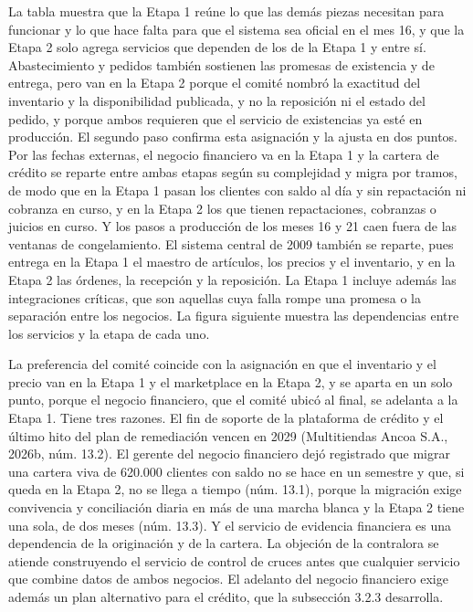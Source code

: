 \documentclass[11pt]{article}
\begin{document}
La tabla muestra que la Etapa 1 reúne lo que las demás piezas necesitan para funcionar y lo que hace falta para que el sistema sea oficial en el mes 16, y que la Etapa 2 solo agrega servicios que dependen de los de la Etapa 1 y entre sí. Abastecimiento y pedidos también sostienen las promesas de existencia y de entrega, pero van en la Etapa 2 porque el comité nombró la exactitud del inventario y la disponibilidad publicada, y no la reposición ni el estado del pedido, y porque ambos requieren que el servicio de existencias ya esté en producción. El segundo paso confirma esta asignación y la ajusta en dos puntos. Por las fechas externas, el negocio financiero va en la Etapa 1 y la cartera de crédito se reparte entre ambas etapas según su complejidad y migra por tramos, de modo que en la Etapa 1 pasan los clientes con saldo al día y sin repactación ni cobranza en curso, y en la Etapa 2 los que tienen repactaciones, cobranzas o juicios en curso. Y los pasos a producción de los meses 16 y 21 caen fuera de las ventanas de congelamiento. El sistema central de 2009 también se reparte, pues entrega en la Etapa 1 el maestro de artículos, los precios y el inventario, y en la Etapa 2 las órdenes, la recepción y la reposición. La Etapa 1 incluye además las integraciones críticas, que son aquellas cuya falla rompe una promesa o la separación entre los negocios. La figura siguiente muestra las dependencias entre los servicios y la etapa de cada uno.


La preferencia del comité coincide con la asignación en que el inventario y el precio van en la Etapa 1 y el marketplace en la Etapa 2, y se aparta en un solo punto, porque el negocio financiero, que el comité ubicó al final, se adelanta a la Etapa 1. Tiene tres razones. El fin de soporte de la plataforma de crédito y el último hito del plan de remediación vencen en 2029 (Multitiendas Ancoa S.A., 2026b, núm. 13.2). El gerente del negocio financiero dejó registrado que migrar una cartera viva de 620.000 clientes con saldo no se hace en un semestre y que, si queda en la Etapa 2, no se llega a tiempo (núm. 13.1), porque la migración exige convivencia y conciliación diaria en más de una marcha blanca y la Etapa 2 tiene una sola, de dos meses (núm. 13.3). Y el servicio de evidencia financiera es una dependencia de la originación y de la cartera. La objeción de la contralora se atiende construyendo el servicio de control de cruces antes que cualquier servicio que combine datos de ambos negocios. El adelanto del negocio financiero exige además un plan alternativo para el crédito, que la subsección 3.2.3 desarrolla.
\end{document}
